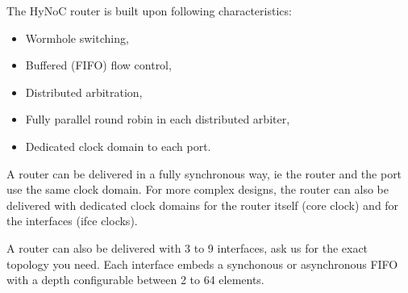 The HyNoC router is built upon following characteristics:

\begin{itemize}
    \item Wormhole switching,
    \item Buffered (FIFO) flow control,
    \item Distributed arbitration,
    \item Fully parallel round robin in each distributed arbiter,
    \item Dedicated clock domain to each port.
\end{itemize}

A router can be delivered in a fully synchronous way, ie the router and the port use the same clock domain. For more
complex designs, the router can also be delivered with dedicated clock domains for the router itself (core clock) and
for the interfaces (ifce clocks).

A router can also be delivered with 3 to 9 interfaces, ask us for the exact topology you need. Each interface embeds a
synchonous or asynchronous FIFO with a depth configurable between 2 to 64 elements.
